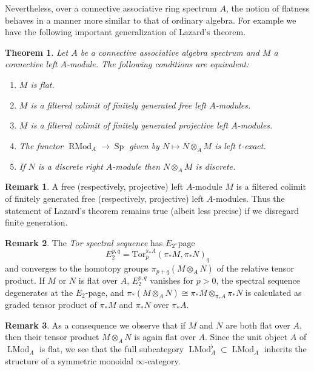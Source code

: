 \documentclass{article}
\newtheorem{theorem}{Theorem}[subsection]
\theoremstyle{definition}
\newtheorem{remark}{Remark}[subsection]
\DeclareMathOperator{\LMod}{LMod}
\DeclareMathOperator{\RMod}{RMod}
\DeclareMathOperator{\Sp}{Sp}
\begin{document}
Nevertheless, over a connective associative ring spectrum $A$, the notion of flatness behaves in a manner more similar to that of ordinary algebra. For example we have the following important generalization of Lazard's theorem.

\begin{theorem}{\em \cite[Theorem 7.2.2.15]{HA}}
Let $A$ be a connective associative algebra spectrum and $M$ a connective left $A$-module. The following conditions are equivalent:
\begin{enumerate}
\itemsep.1em
\item[\em{(1)}]
$M$ is flat.
\item[\em{(2)}]
$M$ is a filtered colimit of finitely generated free left $A$-modules.
\item[\em{(3)}]
$M$ is a filtered colimit of finitely generated projective left $A$-modules.
\item[\em{(4)}]
The functor $\RMod_A\to\Sp$ given by $N\mapsto N\otimes_A M$ is left $t$-exact.
\item[\em{(5)}]
If $N$ is a discrete right $A$-module then $N\otimes_A M$ is discrete.
\end{enumerate}
\end{theorem}
\begin{remark}
A free (respectively, projective) left $A$-module $M$ is a filtered colimit of finitely generated free (respectively, projective) left $A$-modules.
Thus the statement of Lazard's theorem remains true (albeit less precise) if we disregard finite generation.
\end{remark}

\begin{remark}
The {\em Tor spectral sequence} has $E_2$-page
\[
E_2^{p,q} =\mathrm{Tor}^{\pi_*A}_p(\pi_* M,\pi_* N)_q
\]
and converges to the homotopy groups $\pi_{p+q}(M\otimes_A N)$ of the relative tensor product.
If $M$ or $N$ is flat over $A$, $E_2^{p,q}$ vanishes for $p>0$, the spectral sequence degenerates at the $E_2$-page, and
$
\pi_*(M\otimes_A N)\cong\pi_* M\otimes_{\pi_* A}\pi_* N
$
is calculated as graded tensor product of $\pi_* M$ and $\pi_* N$ over $\pi_* A$.
\end{remark}
\begin{remark}
As a consequence we observe that if $M$ and $N$ are both flat over $A$, then their tensor product $M\otimes_A N$ is again
flat over $A$. Since the unit object $A$ of $\LMod_A$ is
flat, we see that the full subcategory $\LMod_A^\flat\subset\LMod_A$ inherits the structure
of a symmetric monoidal $\infty$-category.
\end{remark}
\end{document}

